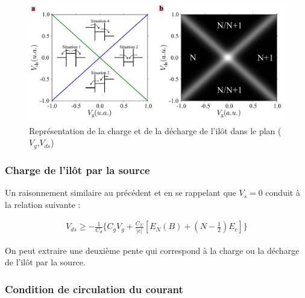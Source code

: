\begin{figure}
\includegraphics[scale=0.5]{Theorie/Transport/figure3/figure3.pdf} 
\caption{Représentation de la charge et de la décharge de l'il\^ot dans le plan ($V_g$,$V_{ds}$)}
\label{charge_discharge}
\end{figure}



\subsubsection{Charge de l'il\^ot par la source}
Un raisonnement similaire au précédent et en se rappelant que $V_s = 0$ conduit à la relation suivante :

\begin{eqnarray}
V_{ds} \geq -\frac{1}{C_d} \{C_gV_g + \frac{C_{\Sigma}}{|e|}[E_N(B) + (N-\frac{1}{2})E_c] \}
\end{eqnarray}


On peut extraire une deuxième pente qui correspond à la charge ou la décharge de l'il\^ot par la source.


\subsubsection{Condition de circulation du courant}

